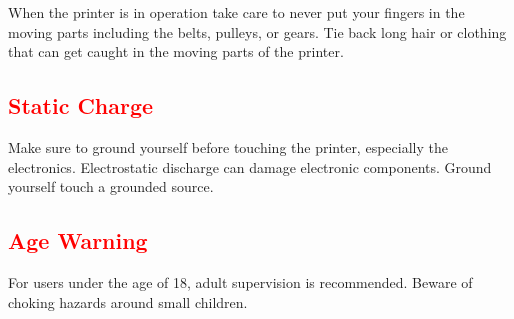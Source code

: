When the printer is in operation take care to never put your fingers in the moving parts including the belts, pulleys, or gears. Tie back long hair or clothing that can get caught in the moving parts of the printer.

\subsection{\textcolor{red}{Static Charge}}
Make sure to ground yourself before touching the printer, especially the electronics. Electrostatic discharge can damage electronic components. Ground yourself touch a grounded source.

\subsection{\textcolor{red}{Age Warning}}

For users under the age of 18, adult supervision is recommended. Beware of choking hazards around small children.


